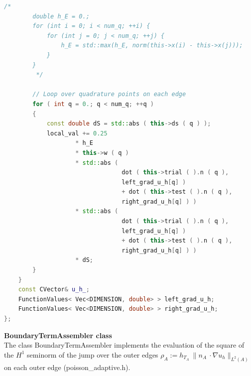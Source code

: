 \documentclass[a4paper, 11pt, twoside]{article}
\begin{document}
\begin{lstlisting}[language=C++, basicstyle={\footnotesize, \ttfamily}, keywordstyle=\color{blue}, numbers=none, tabsize=4]
        /*
        double h_E = 0.;
        for (int i = 0; i < num_q; ++i) {
            for (int j = 0; j < num_q; ++j) {
                h_E = std::max(h_E, norm(this->x(i) - this->x(j)));
            }
        }
         */

        // Loop over quadrature points on each edge
        for ( int q = 0.; q < num_q; ++q )
        {
            const double dS = std::abs ( this->ds ( q ) );
            local_val += 0.25
                    * h_E
                    * this->w ( q )
                    * std::abs (
                                 dot ( this->trial ( ).n ( q ), 
                                 left_grad_u_h[q] )
                                 + dot ( this->test ( ).n ( q ), 
                                 right_grad_u_h[q] ) )
                    * std::abs (
                                 dot ( this->trial ( ).n ( q ), 
                                 left_grad_u_h[q] )
                                 + dot ( this->test ( ).n ( q ), 
                                 right_grad_u_h[q] ) )
                    * dS;
        }
    }
    const CVector& u_h_;
    FunctionValues< Vec<DIMENSION, double> > left_grad_u_h;
    FunctionValues< Vec<DIMENSION, double> > right_grad_u_h;
};
\end{lstlisting}

\textbf{BoundaryTermAssembler class}\\
The class BoundaryTermAssembler implements the evaluation of the square of the $H^1$ seminorm of the jump over 
the outer edges $\rho_{A}:= h_{T_A}\ \|n_{A}\ \cdot \nabla u_h\|_{L^2(A)}$ on each outer edge (poisson\_adaptive.h).
\end{document}
